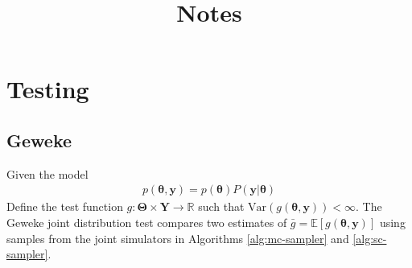 \documentclass{article}
\title{Notes}
\author{}
\date{}
\newcommand{\E}{\mathbb{E}}
\newcommand{\var}{\mathrm{Var}}
\begin{document}
\maketitle

\section{Testing}

\subsection{Geweke}
Given the model
\begin{align}
    p(\mathbf{\theta}, \mathbf{y}) = p(\mathbf{\theta}) P(\mathbf{y} | \mathbf{\theta})
\end{align}
Define the test function $g:\mathbf{\Theta} \times \mathbf{Y} \rightarrow \mathbb{R}$ such that $\var(g(\mathbf{\theta}, \mathbf{y})) < \infty$. The Geweke joint distribution test compares two estimates of 
$\bar{g} = \E[g(\mathbf{\theta}, \mathbf{y})]$ using samples from the joint simulators in Algorithms \ref{alg:mc-sampler} and \ref{alg:sc-sampler}.
\end{document}
